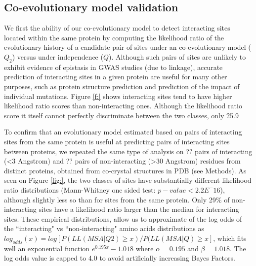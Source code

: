 \subsection{Co-evolutionary model validation}

We first the ability of our co-evolutionary model to detect interacting sites located within the same protein by computing the likelihood ratio of the evolutionary history of a candidate pair of sites under an co-evolutionary model ($Q_2$) versus under independence ($Q$). Although such pairs of sites are unlikely to exhibit evidence of epistasis in GWAS studies (due to linkage), accurate prediction of interacting sites in a given protein are useful for many other purposes, such as protein structure prediction and prediction of the impact of individual mutations.  Figure \ref{f:} shows interacting sites tend to have higher likelihood ratio scores than non-interacting ones. Although the likelihood ratio score it itself cannot perfectly discriminate between the two classes, only 25.9%


To confirm that an evolutionary model estimated based on pairs of interacting sites from the same protein is useful at predicting pairs of interacting sites between proteins, we repeated the same type of analysis on ?? pairs of interacting (<3 Angstrom) and ?? pairs of non-interacting (>30 Angstrom) residues from distinct proteins, obtained from co-crystal structures in PDB (see Methods). As seen on Figure \ref{fig:}, the two classes of sites have substantially different likelihood ratio distributions (Mann-Whitney one sided test: $p-value < 2.2E^-{16}$), although slightly less so than for sites from the same protein. Only 29\% of non-interacting sites have a likelihood ratio larger than the median for interacting sites. These empirical distributions, allow us to approximate of the log odds of the “interacting" vs “non-interacting" amino acids distributions as $log_{odds}(x) = log[P(LL(MSA|Q2) \ge x) / P(LL(MSA|Q) \ge x]$, which fits well an exponential function $e^{0.195 x}-1.018$ where $\alpha = 0.195$ and $\beta = 1.018$. The log odds value is capped to 4.0 to avoid artificially increasing Bayes Factors. 

